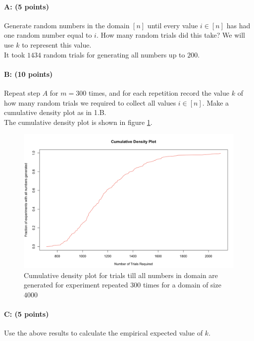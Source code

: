 \documentclass[11pt]{article}
\begin{document}
\paragraph{A: (5 points)}
Generate random numbers in the domain $[n]$ until every value $i \in [n]$ has had one random number equal to $i$.
How many random trials did this take?  
We will use $k$ to represent this value.  \\

It took $1434$ random trials for generating all numbers up to $200$.

\paragraph{B: (10 points)}
Repeat step $A$ for $m=300$ times, and for each repetition record the value $k$ of how many random trials we required to collect all values $i \in [n]$.  
Make a cumulative density plot as in 1.B.  \\

The cumulative density plot is shown in figure \ref{cumplot2}.

\begin{figure}[!htb]
\centering
\includegraphics[width=5.5in]{figures/cumdenplot2b.png}
\caption{Cumulative density plot for trials till all numbers in domain are generated for experiment repeated $300$ times for a domain of size $4000$}
\label{cumplot2}
\end{figure}

\paragraph{C: (5 points)}
Use the above results to calculate the empirical expected value of $k$.\\
\end{document}
